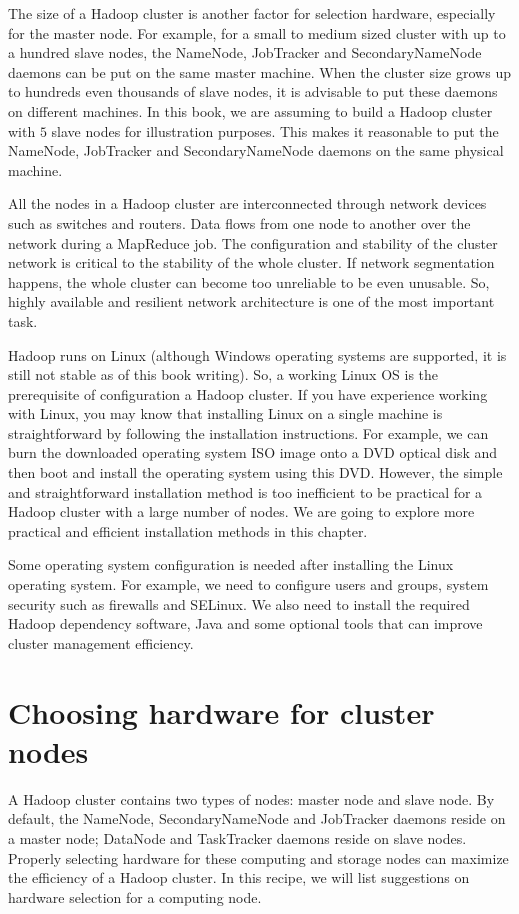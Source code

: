 The size of a Hadoop cluster is another factor for selection hardware, especially for the master node. For example, for a small to medium sized cluster with up to a hundred slave nodes, the NameNode, JobTracker and SecondaryNameNode daemons can be put on the same master machine. When the cluster size grows up to hundreds even thousands of slave nodes, it is advisable to put these daemons on different machines. In this book, we are assuming to build a Hadoop cluster with $5$ slave nodes for illustration purposes. This makes it reasonable to put the NameNode, JobTracker and SecondaryNameNode daemons on the same physical machine.

All the nodes in a Hadoop cluster are interconnected through network devices such as switches and routers. Data flows from one node to another over the network during a MapReduce job. The configuration and stability of the cluster network is critical to the stability of the whole cluster. If network segmentation happens, the whole cluster can become too unreliable to be even unusable. So, highly available and resilient network architecture is one of the most important task.

Hadoop runs on Linux (although Windows operating systems are supported, it is still not stable as of this book writing). So, a working Linux OS is the prerequisite of configuration a Hadoop cluster. If you have experience working with Linux, you may know that installing Linux on a single machine is straightforward by following the installation instructions. For example, we can burn the downloaded operating system ISO image onto a DVD optical disk and then boot and install the operating system using this DVD. However, the simple and straightforward installation method is too inefficient to be practical for a Hadoop cluster with a large number of nodes. We are going to explore more practical and efficient installation methods in this chapter.

Some operating system configuration is needed after installing the Linux operating system. For example, we need to configure users and groups, system security such as firewalls and SELinux. We also need to install the required Hadoop dependency software, Java and some optional tools that can improve cluster management efficiency.
\section{Choosing hardware for cluster nodes}
A Hadoop cluster contains two types of nodes: master node and slave node. By default, the NameNode, SecondaryNameNode and JobTracker daemons reside on a master node; DataNode and TaskTracker daemons reside on slave nodes. Properly selecting hardware for these computing and storage nodes can maximize the efficiency of a Hadoop cluster. In this recipe, we will list suggestions on hardware selection for a computing node.
